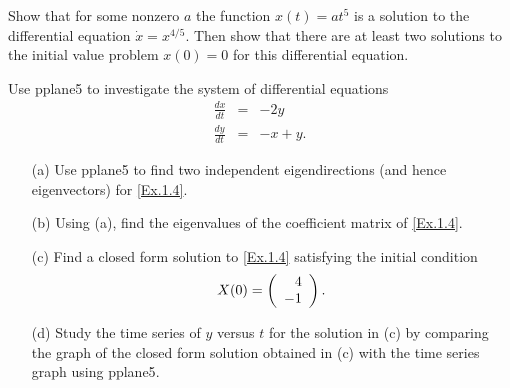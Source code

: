 \documentclass{ximera}
\begin{document}
\begin{exercise}  \label{c6.1.4A}
Show that for some nonzero $a$ the function $x(t)=at^5$ is a solution to the
differential equation $\dot{x}=x^{4/5}$.  Then show that there are at least
two solutions to the initial value problem $x(0)=0$ for this differential
equation.
\end{exercise}


\CEXER

\begin{exercise} \label{c6.1.4}
Use {\sf pplane5} to investigate the system
of differential equations
\begin{equation}  \label{Ex.1.4}
\begin{array}{rcr}
\frac{dx}{dt}  & = & -2y \\
\frac{dy}{dt}  & = &  -x+y.
\end{array}
\end{equation}
\begin{itemize}
\item[(a)] Use {\sf pplane5} to find two independent eigendirections (and
hence eigenvectors) for \eqref{Ex.1.4}.
\item[(b)] Using (a), find the eigenvalues of the coefficient matrix of
\eqref{Ex.1.4}.
\item[(c)] Find a closed form solution to \eqref{Ex.1.4} satisfying the initial
condition
\[
X(0) = \left(\begin{array}{r} 4 \\ -1\end{array}\right).
\]
\item[(d)] Study the time series of $y$ versus $t$ for the solution in (c)
by comparing the graph of the closed form solution obtained in (c) with the
time series graph using {\sf pplane5}.
\end{itemize}
\end{exercise}
\end{document}
